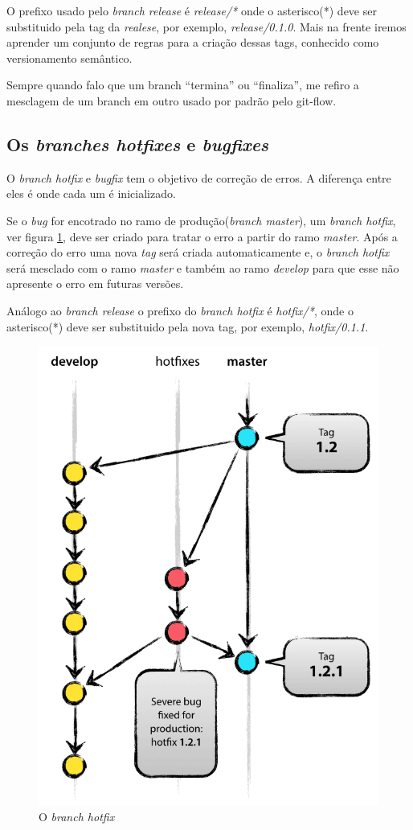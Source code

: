 \documentclass[12pt,openright,oneside,a4paper,english,brazil]{abntex2}
\begin{document}
O prefixo usado pelo \textit{branch release} é \textit{release/*} onde o asterisco(*) deve ser substituido pela tag da \textit{realese}, por exemplo, \textit{release/0.1.0}. Mais na frente iremos aprender um conjunto de regras para a criação dessas tags, conhecido como versionamento semântico.

Sempre quando falo que um branch ``termina'' ou ``finaliza'', me refiro a mesclagem de um branch em outro usado por padrão pelo git-flow.

\subsection{Os \textit{branches hotfixes} e \textit{bugfixes}}

O \textit{branch hotfix} e \textit{bugfix} tem o objetivo de correção de erros. A diferença entre eles é onde cada um é inicializado. 

Se o \textit{bug} for encotrado no ramo de produção(\textit{branch master}), um \textit{branch hotfix}, ver figura \ref{hotfix}, deve ser criado para tratar o erro a partir do ramo \textit{master}. Após a correção do erro uma nova \textit{tag} será criada automaticamente e, o \textit{branch hotfix} será mesclado com o ramo \textit{master} e também ao ramo \textit{develop} para que esse não apresente o erro em futuras versões.

Análogo ao \textit{branch release} o prefixo do \textit{branch hotfix} é \textit{hotfix/*}, onde o asterisco(*) deve ser substituido pela nova tag, por exemplo, \textit{hotfix/0.1.1}.

\begin{figure}[h]
	\caption{\label{hotfix}O \textit{branch hotfix}}
	\begin{center}
		\includegraphics[width=0.6\linewidth]{imagens/hotfix}
	\end{center}
\end{figure}
\end{document}
